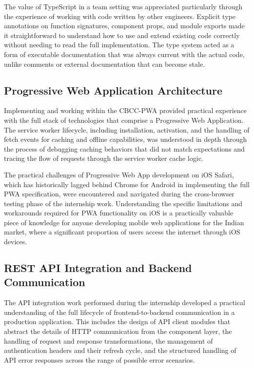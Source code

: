 The value of TypeScript in a team setting was appreciated particularly through the experience of working with code written by other engineers. Explicit type annotations on function signatures, component props, and module exports made it straightforward to understand how to use and extend existing code correctly without needing to read the full implementation. The type system acted as a form of executable documentation that was always current with the actual code, unlike comments or external documentation that can become stale.

\subsection{Progressive Web Application Architecture}

Implementing and working within the CBCC-PWA provided practical experience with the full stack of technologies that comprise a Progressive Web Application. The service worker lifecycle, including installation, activation, and the handling of fetch events for caching and offline capabilities, was understood in depth through the process of debugging caching behaviors that did not match expectations and tracing the flow of requests through the service worker cache logic.

The practical challenges of Progressive Web App development on iOS Safari, which has historically lagged behind Chrome for Android in implementing the full PWA specification, were encountered and navigated during the cross-browser testing phase of the internship work. Understanding the specific limitations and workarounds required for PWA functionality on iOS is a practically valuable piece of knowledge for anyone developing mobile web applications for the Indian market, where a significant proportion of users access the internet through iOS devices.

\subsection{REST API Integration and Backend Communication}

The API integration work performed during the internship developed a practical understanding of the full lifecycle of frontend-to-backend communication in a production application. This includes the design of API client modules that abstract the details of HTTP communication from the component layer, the handling of request and response transformations, the management of authentication headers and their refresh cycle, and the structured handling of API error responses across the range of possible error scenarios.

